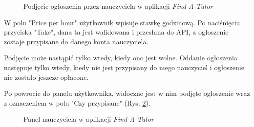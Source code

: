 \documentclass[12pt]{article}
\newcommand{\cmark}{\textcolor{green!80!black}{\ding{51}}}
\numberwithin{figure}{section}
\begin{document}
\begin{sloppypar}
\begin{figure}[!htbp] 
    \centering
    \caption{Podjęcie ogłoszenia przez nauczyciela w aplikacji \textit{Find-A-Tutor}}
    \label{fig:take}
\end{figure}

W polu "Price per hour" użytkownik wpisuje stawkę godzinową. Po naciśnięciu przyciska "Take", dana ta jest walidowana i przesłana do API, a ogłoszenie zostaje przypisane do danego konta nauczyciela.

Podjęcie może nastąpić tylko wtedy, kiedy ono jest wolne. Oddanie ogłoszenia następuje tylko wtedy, kiedy nie jest przypisany do niego nauczyciel i ogłoszenie nie zostało jeszcze opłacone.

Po powrocie do panelu użytkownika, widoczne jest w nim podjęte ogłoszenie wraz z oznaczeniem \cmark w polu "Czy przypisane" (Rys. \ref{fig:tutor-assigned}).
\begin{figure}[!htbp] 
    \centering
    \caption{Panel nauczyciela w aplikacji \textit{Find-A-Tutor}}
    \label{fig:tutor-assigned}
\end{figure}


\end{sloppypar}
\end{document}
